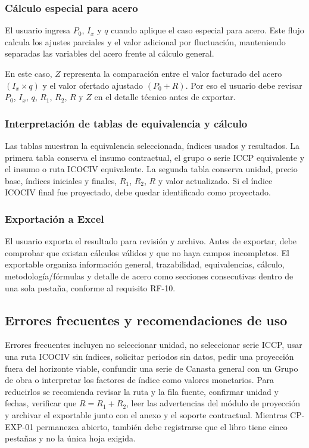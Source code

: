 \documentclass[12pt,letterpaper]{article}
\newcommand{\ICOCIV}{ICOCIV}
\newcommand{\ICCP}{ICCP}
\begin{document}
\subsubsection{Cálculo especial para acero}

El usuario ingresa \(P_0\), \(I_x\) y \(q\) cuando aplique el caso especial para acero. Este flujo calcula los ajustes parciales y el valor adicional por fluctuación, manteniendo separadas las variables del acero frente al cálculo general.

En este caso, \(Z\) representa la comparación entre el valor facturado del acero \((I_x \times q)\) y el valor ofertado ajustado \((P_0+R)\). Por eso el usuario debe revisar \(P_0\), \(I_x\), \(q\), \(R_1\), \(R_2\), \(R\) y \(Z\) en el detalle técnico antes de exportar.

\subsubsection{Interpretación de tablas de equivalencia y cálculo}

Las tablas muestran la equivalencia seleccionada, índices usados y resultados. La primera tabla conserva el insumo contractual, el grupo o serie \ICCP{} equivalente y el insumo o ruta \ICOCIV{} equivalente. La segunda tabla conserva unidad, precio base, índices iniciales y finales, \(R_1\), \(R_2\), \(R\) y valor actualizado. Si el índice \ICOCIV{} final fue proyectado, debe quedar identificado como proyectado.

\subsubsection{Exportación a Excel}

El usuario exporta el resultado para revisión y archivo. Antes de exportar, debe comprobar que existan cálculos válidos y que no haya campos incompletos. El exportable organiza información general, trazabilidad, equivalencias, cálculo, metodología/fórmulas y detalle de acero como secciones consecutivas dentro de una sola pestaña, conforme al requisito RF-10.

\subsection{Errores frecuentes y recomendaciones de uso}

Errores frecuentes incluyen no seleccionar unidad, no seleccionar serie \ICCP, usar una ruta \ICOCIV{} sin índices, solicitar periodos sin datos, pedir una proyección fuera del horizonte viable, confundir una serie de Canasta general con un Grupo de obra o interpretar los factores de índice como valores monetarios. Para reducirlos se recomienda revisar la ruta y la fila fuente, confirmar unidad y fechas, verificar que \(R=R_1+R_2\), leer las advertencias del módulo de proyección y archivar el exportable junto con el anexo y el soporte contractual. Mientras CP-EXP-01 permanezca abierto, también debe registrarse que el libro tiene cinco pestañas y no la única hoja exigida.
\end{document}
